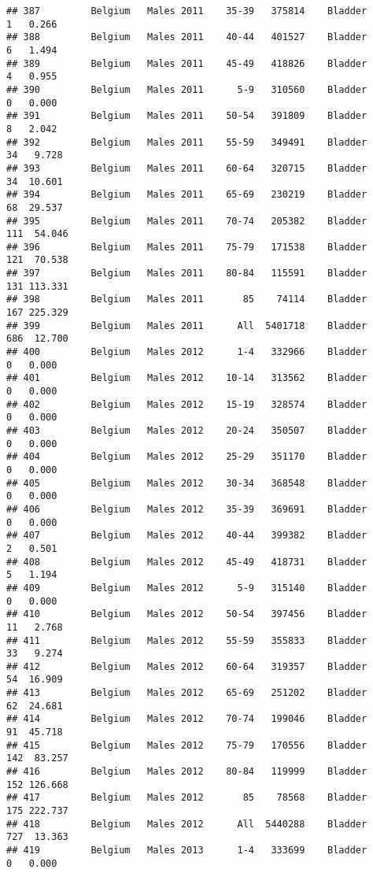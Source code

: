 \documentclass[
]{article}
\begin{document}
\begin{verbatim}
## 387         Belgium   Males 2011    35-39   375814    Bladder      1   0.266
## 388         Belgium   Males 2011    40-44   401527    Bladder      6   1.494
## 389         Belgium   Males 2011    45-49   418826    Bladder      4   0.955
## 390         Belgium   Males 2011      5-9   310560    Bladder      0   0.000
## 391         Belgium   Males 2011    50-54   391809    Bladder      8   2.042
## 392         Belgium   Males 2011    55-59   349491    Bladder     34   9.728
## 393         Belgium   Males 2011    60-64   320715    Bladder     34  10.601
## 394         Belgium   Males 2011    65-69   230219    Bladder     68  29.537
## 395         Belgium   Males 2011    70-74   205382    Bladder    111  54.046
## 396         Belgium   Males 2011    75-79   171538    Bladder    121  70.538
## 397         Belgium   Males 2011    80-84   115591    Bladder    131 113.331
## 398         Belgium   Males 2011       85    74114    Bladder    167 225.329
## 399         Belgium   Males 2011      All  5401718    Bladder    686  12.700
## 400         Belgium   Males 2012      1-4   332966    Bladder      0   0.000
## 401         Belgium   Males 2012    10-14   313562    Bladder      0   0.000
## 402         Belgium   Males 2012    15-19   328574    Bladder      0   0.000
## 403         Belgium   Males 2012    20-24   350507    Bladder      0   0.000
## 404         Belgium   Males 2012    25-29   351170    Bladder      0   0.000
## 405         Belgium   Males 2012    30-34   368548    Bladder      0   0.000
## 406         Belgium   Males 2012    35-39   369691    Bladder      0   0.000
## 407         Belgium   Males 2012    40-44   399382    Bladder      2   0.501
## 408         Belgium   Males 2012    45-49   418731    Bladder      5   1.194
## 409         Belgium   Males 2012      5-9   315140    Bladder      0   0.000
## 410         Belgium   Males 2012    50-54   397456    Bladder     11   2.768
## 411         Belgium   Males 2012    55-59   355833    Bladder     33   9.274
## 412         Belgium   Males 2012    60-64   319357    Bladder     54  16.909
## 413         Belgium   Males 2012    65-69   251202    Bladder     62  24.681
## 414         Belgium   Males 2012    70-74   199046    Bladder     91  45.718
## 415         Belgium   Males 2012    75-79   170556    Bladder    142  83.257
## 416         Belgium   Males 2012    80-84   119999    Bladder    152 126.668
## 417         Belgium   Males 2012       85    78568    Bladder    175 222.737
## 418         Belgium   Males 2012      All  5440288    Bladder    727  13.363
## 419         Belgium   Males 2013      1-4   333699    Bladder      0   0.000

\end{verbatim}
\end{document}
